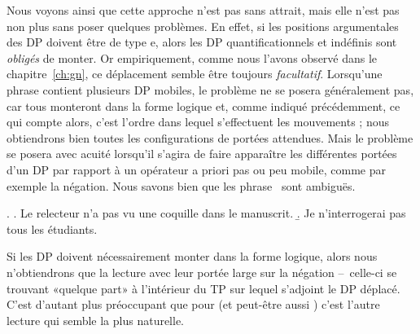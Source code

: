 Nous voyons ainsi que cette approche n'est pas sans attrait, mais elle n'est pas non plus sans poser quelques problèmes. 
En effet, si les positions argumentales des DP doivent être de type \typ e, alors les DP quantificationnels et indéfinis sont \emph{obligés} de monter.  
Or empiriquement, comme nous l'avons observé  dans le chapitre~\ref{ch:gn},  ce déplacement semble être toujours \emph{facultatif}.  
Lorsqu'une phrase contient plusieurs DP mobiles, le problème ne se posera généralement pas, car tous monteront dans la forme logique et, comme indiqué précédemment, ce qui compte alors, c'est l'ordre dans lequel s'effectuent les mouvements ; nous obtiendrons bien toutes les configurations de portées attendues. 
Mais le problème se posera avec acuité lorsqu'il s'agira de faire apparaître les différentes portées d'un DP par rapport à un opérateur a priori pas ou peu mobile, comme par exemple la négation. 
Nous savons bien que les phrase \Next\ sont ambiguës.

\ex.
\a.
Le relecteur n'a pas vu une coquille dans le manuscrit.
\b.
Je n'interrogerai pas tous les étudiants.


Si les DP doivent nécessairement monter dans la forme logique, alors nous n'obtiendrons que la lecture avec leur portée large sur la négation --~celle-ci se trouvant «quelque part» à l'intérieur du TP sur lequel s'adjoint le DP déplacé. 
C'est d'autant plus préoccupant que pour \Last[b] (et peut-être aussi \Last[a]) c'est l'autre lecture qui semble la plus naturelle.



